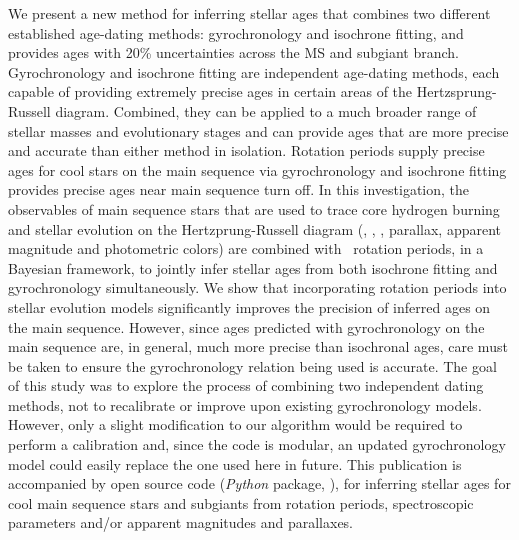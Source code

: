 We present a new method for inferring stellar ages that combines two different
established age-dating methods: gyrochronology and isochrone fitting, and
provides ages with 20\% uncertainties across the MS and subgiant branch.
Gyrochronology and isochrone fitting are independent age-dating methods, each
capable of providing extremely precise ages in certain areas of the
Hertzsprung-Russell diagram.
Combined, they can be applied to a much broader range of stellar masses and
evolutionary stages and can provide ages that are more precise and accurate
than either method in isolation.
Rotation periods supply precise ages for cool stars on the main sequence via
gyrochronology and isochrone fitting provides precise ages near main sequence
turn off.
In this investigation, the observables of main sequence stars that are used to
trace core hydrogen burning and stellar evolution on the Hertzprung-Russell
diagram (\teff, \feh, \logg, parallax, apparent magnitude and photometric
colors) are combined with \kepler\ rotation periods, in a Bayesian framework,
to jointly infer stellar ages from both isochrone fitting and gyrochronology
simultaneously.
We show that incorporating rotation periods into stellar evolution models
significantly improves the precision of inferred ages on the main sequence.
However, since ages predicted with gyrochronology on the main sequence are, in
general, much more precise than isochronal ages, care must be taken to ensure
the gyrochronology relation being used is accurate.
The goal of this study was to explore the process of combining two independent
dating methods, not to recalibrate or improve upon existing gyrochronology
models.
However, only a slight modification to our algorithm would be required to
perform a calibration and, since the code is modular, an updated
gyrochronology model could easily replace the one used here in future.
This publication is accompanied by open source code ({\it Python} package,
\sd), for inferring stellar ages for cool main sequence stars and subgiants
from rotation periods, spectroscopic parameters and/or apparent magnitudes and
parallaxes.
